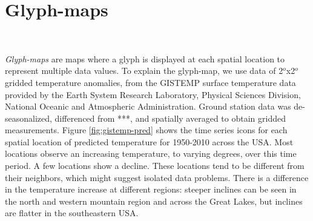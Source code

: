 \documentclass[oneside]{article}
\begin{document}
\section{Glyph-maps}~\label{sec:glyph-map}

\emph{Glyph-maps} are maps where a glyph is displayed at each spatial location to represent multiple data values. To explain the glyph-map, we use data of 2$^o$x2$^o$ gridded temperature anomalies, from the GISTEMP surface temperature data provided by the Earth System Research Laboratory, Physical Sciences Division, National Oceanic and Atmospheric Administration. Ground station data was de-seasonalized, differenced from ***, and spatially averaged to obtain gridded measurements. Figure \ref{fig:gistemp-pred} shows the time series icons for each spatial location of predicted temperature for 1950-2010 across the USA. Most locations observe an increasing temperature, to varying degrees, over this time period. A few locations show a decline. These locations tend to be different from their neighbors, which might suggest isolated data problems. There is a difference in the temperature increase at different regions: steeper inclines can be seen in the north and western mountain region and across the Great Lakes, but inclines are flatter in the southeastern USA. 
\end{document}
